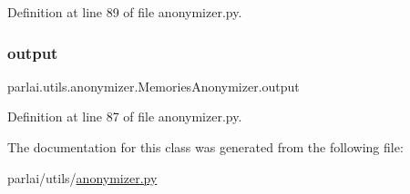 Definition at line 89 of file anonymizer.\+py.

\mbox{\label{classparlai_1_1utils_1_1anonymizer_1_1MemoriesAnonymizer_abfbdf36b25476c6aa1a90e4faf43e6f3}} 
\subsubsection{\texorpdfstring{output}{output}}
{\footnotesize\ttfamily parlai.\+utils.\+anonymizer.\+Memories\+Anonymizer.\+output}



Definition at line 87 of file anonymizer.\+py.



The documentation for this class was generated from the following file\+:\begin{DoxyCompactItemize}
\item 
parlai/utils/\hyperlink{anonymizer_8py}{anonymizer.\+py}\end{DoxyCompactItemize}
